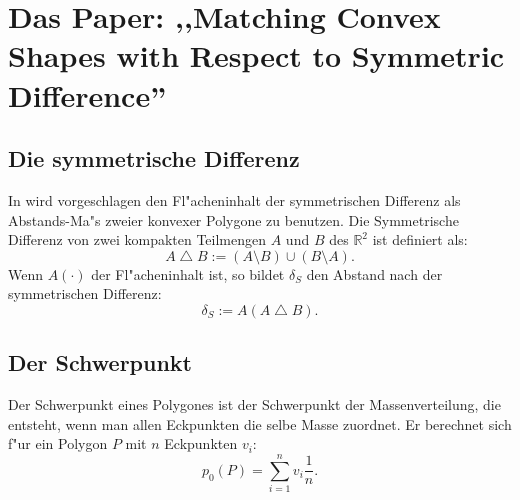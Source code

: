 \section{Das Paper: ,,Matching Convex Shapes with Respect to Symmetric Difference'' }

\subsection{Die symmetrische Differenz}

In \cite{AFRW} wird vorgeschlagen den Fl"acheninhalt der symmetrischen Differenz als Abstands-Ma"s zweier konvexer Polygone zu benutzen. Die Symmetrische Differenz von zwei kompakten Teilmengen $A$ und $B$ des $\mathbb{R}^2 $ ist definiert als:
\[A\bigtriangleup B:=(A\setminus B)\cup(B\setminus A).\]
Wenn $A(\cdot)$ der Fl"acheninhalt ist, so bildet $\delta_S$ den Abstand nach der symmetrischen Differenz:
\[\delta_S:=A(A \bigtriangleup B).\]

\subsection{Der Schwerpunkt}

Der Schwerpunkt eines Polygones ist der Schwerpunkt der Massenverteilung, die entsteht, wenn man allen Eckpunkten die selbe Masse zuordnet. Er berechnet sich f"ur ein Polygon $P$ mit $n$ Eckpunkten $v_i$:
\[p_0(P)=\sum^n_{i=1}v_i \frac{1}{n}.\]



